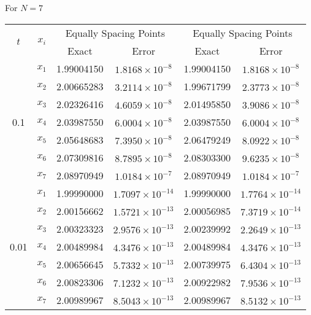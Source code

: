 \documentclass[12pt, a4paper]{article}
\begin{document}
For \( N = 7 \)

\begin{table}[ht]
	\renewcommand{\arraystretch}{1.5}
	\centering
	\begin{tabular}{|c|c|c|c|c|c|}
		\hline
		\multirow{2}{*}{\( t \)} & \multirow{2}{*}{\( x_i \)} & \multicolumn{2}{c|}{Equally Spacing Points} & \multicolumn{2}{c|}{Equally Spacing Points} \\
		\cline{3-6}
		& & Exact & Error & Exact & Error \\
		\hline
		\multirow{7}{*}{0.1} & \( x_1 \) & 1.99004150 & \( 1.8168 \times 10^{-8} \) & 1.99004150 & \( 1.8168 \times 10^{-8} \) \\
		& \( x_2 \) & 2.00665283 & \( 3.2114 \times 10^{-8} \) & 1.99671799 & \( 2.3773 \times 10^{-8} \) \\
		& \( x_3 \) & 2.02326416 & \( 4.6059 \times 10^{-8} \) & 2.01495850 & \( 3.9086 \times 10^{-8} \) \\
		& \( x_4 \) & 2.03987550 & \( 6.0004 \times 10^{-8} \) & 2.03987550 & \( 6.0004 \times 10^{-8} \) \\
		& \( x_5 \) & 2.05648683 & \( 7.3950 \times 10^{-8} \) & 2.06479249 & \( 8.0922 \times 10^{-8} \) \\
		& \( x_6 \) & 2.07309816 & \( 8.7895 \times 10^{-8} \) & 2.08303300 & \( 9.6235 \times 10^{-8} \) \\
		& \( x_7 \) & 2.08970949 & \( 1.0184 \times 10^{-7} \) & 2.08970949 & \( 1.0184 \times 10^{-7} \) \\
		\hline
		\multirow{7}{*}{0.01} & \( x_1 \) & 1.99990000 & \( 1.7097 \times 10^{-14} \) & 1.99990000 & \( 1.7764 \times 10^{-14} \) \\
		& \( x_2 \) & 2.00156662 & \( 1.5721 \times 10^{-13} \) & 2.00056985 & \( 7.3719 \times 10^{-14} \) \\
		& \( x_3 \) & 2.00323323 & \( 2.9576 \times 10^{-13} \) & 2.00239992 & \( 2.2649 \times 10^{-13} \) \\
		& \( x_4 \) & 2.00489984 & \( 4.3476 \times 10^{-13} \) & 2.00489984 & \( 4.3476 \times 10^{-13} \) \\
		& \( x_5 \) & 2.00656645 & \( 5.7332 \times 10^{-13} \) & 2.00739975 & \( 6.4304 \times 10^{-13} \) \\
		& \( x_6 \) & 2.00823306 & \( 7.1232 \times 10^{-13} \) & 2.00922982 & \( 7.9536 \times 10^{-13} \) \\
		& \( x_7 \) & 2.00989967 & \( 8.5043 \times 10^{-13} \) & 2.00989967 & \( 8.5132 \times 10^{-13} \) \\
		\hline
	\end{tabular}
\end{table}
\end{document}
